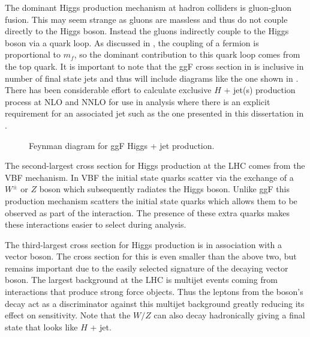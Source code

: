 The dominant Higgs production mechanism at hadron colliders is gluon-gluon
fusion.  This may seem strange as gluons are massless and thus do not couple
directly to the Higgs boson.  Instead the gluons indirectly couple to the Higgs
boson via a quark loop.  As discussed in , the
coupling of a fermion is proportional to $m_f$, so the dominant contribution to
this quark loop comes from the top quark. It is important to note that the ggF
cross section in  is inclusive in number
of final state jets and thus will include diagrams like the one shown in
.  There has been considerable effort to calculate exclusive
$H$ + jet(s) production process at NLO and NNLO \cite{deFlorian:2016spz} for
use in analysis where there is an explicit requirement for an associated jet
such as the one presented in this dissertation in .

\begin{figure}[!htbp]
\centering
{}
\caption{Feynman diagram for ggF Higgs + jet production.}
\label{fig:h_plus_j}
\end{figure}

The second-largest cross section for Higgs production at the LHC comes from the VBF
mechanism.  In VBF the initial state quarks scatter via the exchange of a
$W^{\pm}$ or $Z$ boson which subsequently radiates the Higgs boson.  Unlike ggF
this production mechanism scatters the initial state quarks which allows them to
be observed as part of the interaction.  The presence of these extra quarks
makes these interactions easier to select during analysis.

The third-largest cross section for Higgs production is in association with a
vector boson. The cross section for this is even smaller than the above two, but
remains important due to the easily selected signature of the decaying vector
boson.  The largest background at the LHC is multijet events coming from
interactions that produce strong force objects.  Thus the leptons from the
boson's decay act as a discriminator against this multijet background greatly
reducing its effect on sensitivity. Note that the $W/Z$ can also decay
hadronically giving a final state that looks like $H$ + jet.


